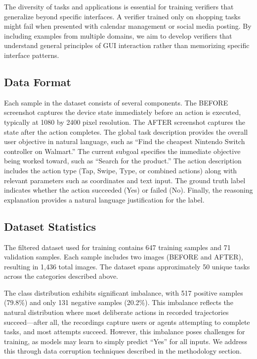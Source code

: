 \documentclass[11pt,a4paper]{article}
\begin{document}
The diversity of tasks and applications is essential for training verifiers that generalize beyond specific interfaces. A verifier trained only on shopping tasks might fail when presented with calendar management or social media posting. By including examples from multiple domains, we aim to develop verifiers that understand general principles of GUI interaction rather than memorizing specific interface patterns.

\subsection{Data Format}

Each sample in the dataset consists of several components. The BEFORE screenshot captures the device state immediately before an action is executed, typically at 1080 by 2400 pixel resolution. The AFTER screenshot captures the state after the action completes. The global task description provides the overall user objective in natural language, such as ``Find the cheapest Nintendo Switch controller on Walmart.'' The current subgoal specifies the immediate objective being worked toward, such as ``Search for the product.'' The action description includes the action type (Tap, Swipe, Type, or combined actions) along with relevant parameters such as coordinates and text input. The ground truth label indicates whether the action succeeded (Yes) or failed (No). Finally, the reasoning explanation provides a natural language justification for the label.

\subsection{Dataset Statistics}

The filtered dataset used for training contains 647 training samples and 71 validation samples. Each sample includes two images (BEFORE and AFTER), resulting in 1,436 total images. The dataset spans approximately 50 unique tasks across the categories described above.

The class distribution exhibits significant imbalance, with 517 positive samples (79.8\%) and only 131 negative samples (20.2\%). This imbalance reflects the natural distribution where most deliberate actions in recorded trajectories succeed---after all, the recordings capture users or agents attempting to complete tasks, and most attempts succeed. However, this imbalance poses challenges for training, as models may learn to simply predict ``Yes'' for all inputs. We address this through data corruption techniques described in the methodology section.
\end{document}
